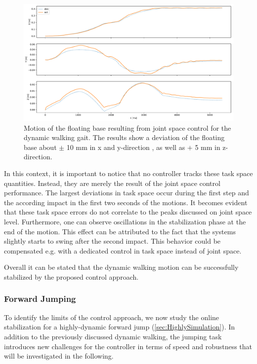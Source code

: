 \begin{figure}[h!]
\centering	
\includegraphics[width=1\textwidth]{fig/walkDynamic/pybullet/pybulletBase}
\caption[Motion of the floating base for dynamic walking]{Motion of the floating base resulting from joint space control for the dynamic walking gait. The results show a deviation of the floating base about $\pm$ 10 mm in x and y-direction , as well as $+$ 5 mm in z-direction.}
\label{fig:walkDynamic_pybulletBase}
\end{figure}

In this context, it is important to notice that no controller tracks these task space quantities. Instead, they are merely the result of the joint space control performance. The largest deviations in task space occur during the first step and the according impact in the first two seconds of the motions. It becomes evident that these task space errors do not correlate to the peaks discussed on joint space level. Furthermore, one can observe oscillations in the stabilization phase at the end of the motion. This effect can be attributed to the fact that the systems slightly starts to swing after the second impact. This behavior could be compensated e.g. with a dedicated control in task space instead of joint space. 

Overall it can be stated that the dynamic walking motion can be successfully stabilized by the proposed control approach. 

\subsubsection{Forward Jumping}
To identify the limits of the control approach, we now study the online stabilization for a highly-dynamic forward jump (\cref{sec:HighlySimulation}). In addition to the previously discussed dynamic walking, the jumping task introduces new challenges for the controller in terms of speed and robustness that will be investigated in the following.  

